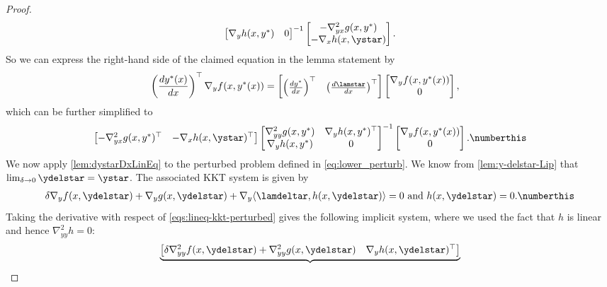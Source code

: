 \begin{proof}
\[\begin{bmatrix}
\nabla_y h(x,y^{*}) & 0
\end{bmatrix}^{-1}\begin{bmatrix}-\nabla^2_{yx}g(x,y^{*})\\
-\nabla_x h(x,\ystar)
\end{bmatrix}.\]
So we can express the right-hand side of the claimed equation in the lemma statement by 
\begin{align*}
\left(\frac{d y^{*}(x)}{d x}\right)^\top\nabla_{y}f(x,y^{*}(x))&=\begin{bmatrix} \left(\frac{dy^*}{dx}\right)^\top & \left(\frac{d\lamstar}{dx}\right)^\top\end{bmatrix}\begin{bmatrix}\nabla_{y}f(x,y^{*}(x))\\ 
0\end{bmatrix},
\end{align*} which can be further simplified to \[\begin{bmatrix}-\nabla^2_{yx} g(x,y^{*})^\top & -\nabla_x h(x,\ystar)^\top\end{bmatrix}\begin{bmatrix}\nabla^2_{yy} g(x,y^{*}) & \nabla_y h(x,y^{*})^{\top}\\
\nabla_y h(x,y^{*}) & 0
\end{bmatrix}^{-1}\begin{bmatrix}\nabla_{y}f(x,y^{*}(x))\\ 
0\end{bmatrix}.\numberthis\label{prop3eq:RHS}\]
We now apply \cref{lem:dystarDxLinEq} to the perturbed problem defined in \cref{eq:lower_perturb}.
We know from \cref{lem:y-delstar-Lip} that $\lim_{\delta\rightarrow0}\ydelstar=\ystar$. 
The associated KKT system is given by
\begin{align*}
\delta \nabla_y f (x,\ydelstar)+\nabla_y g(x,\ydelstar)+\nabla_y \langle\lamdeltar,  h(x,\ydelstar)\rangle  =0 \text{ and }
h(x,\ydelstar) =0. \numberthis\label{eqs:lineq-kkt-perturbed}
\end{align*}
Taking the derivative with respect of \cref{eqs:lineq-kkt-perturbed} gives the following  implicit  system, where we used the fact that $h$ is linear and hence $\nabla^2_{yy} h=0$:  
\begin{equation}
\underbrace{\begin{bmatrix}\delta \nabla^2_{yy} f(x,\ydelstar)+\nabla^2_{yy} g(x,\ydelstar) & \nabla_y h(x,\ydelstar)^{\top}\\

\end{bmatrix}}
\end{equation}
\end{proof}
